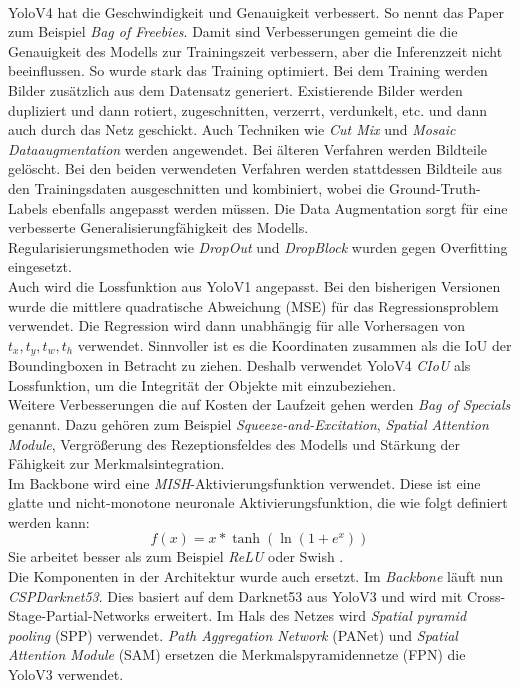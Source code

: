 \documentclass[conference]{IEEEtran}
\begin{document}
	\\
	YoloV4 hat die Geschwindigkeit und Genauigkeit verbessert. So nennt das Paper \cite{b2} zum Beispiel \textit{Bag of Freebies}. Damit sind Verbesserungen gemeint die die Genauigkeit des Modells zur Trainingszeit verbessern, aber die Inferenzzeit nicht beeinflussen. So wurde stark das Training optimiert. Bei dem Training werden Bilder zusätzlich aus dem Datensatz generiert. Existierende Bilder werden dupliziert und dann rotiert, zugeschnitten, verzerrt, verdunkelt, etc. und dann auch durch das Netz geschickt. 
	Auch Techniken wie \textit{Cut Mix} und \textit{Mosaic Dataaugmentation} werden angewendet. Bei älteren Verfahren werden Bildteile gelöscht. Bei den beiden verwendeten Verfahren werden stattdessen Bildteile aus den Trainingsdaten ausgeschnitten und kombiniert, wobei die Ground-Truth-Labels ebenfalls angepasst werden müssen. Die Data Augmentation sorgt für eine verbesserte Generalisierungfähigkeit des Modells.\\
	Regularisierungsmethoden wie \textit{DropOut} und \textit{DropBlock} wurden gegen Overfitting eingesetzt.\\
	Auch wird die Lossfunktion aus YoloV1 angepasst. Bei den bisherigen Versionen wurde die mittlere quadratische Abweichung (MSE) für das Regressionsproblem verwendet. Die Regression wird dann unabhängig für alle Vorhersagen von $t_x, t_y, t_w, t_h$ verwendet. Sinnvoller ist es die Koordinaten zusammen als die IoU der Boundingboxen in Betracht zu ziehen. Deshalb verwendet YoloV4 \textit{CIoU} als Lossfunktion, um die Integrität der Objekte mit einzubeziehen.\\
	Weitere Verbesserungen die auf Kosten der Laufzeit gehen werden \textit{Bag of Specials} genannt. Dazu gehören zum Beispiel \textit{Squeeze-and-Excitation}, \textit{Spatial Attention Module}, Vergrößerung des Rezeptionsfeldes des Modells und Stärkung der Fähigkeit zur Merkmalsintegration.\\
	Im Backbone wird eine \textit{MISH}-Aktivierungsfunktion verwendet. Diese ist eine glatte und nicht-monotone neuronale Aktivierungsfunktion, die wie folgt definiert werden kann:
	\[ f(x) = x* \tanh (\ln (1+e^x)) \]
	Sie arbeitet besser als zum Beispiel \textit{ReLU} oder Swish \cite{b7}.\\
	Die Komponenten in der Architektur wurde auch ersetzt. Im \textit{Backbone} läuft nun \textit{CSPDarknet53}. Dies basiert auf dem Darknet53 aus YoloV3 und wird mit Cross-Stage-Partial-Networks erweitert. Im Hals des Netzes wird \textit{Spatial pyramid pooling} (SPP) verwendet. \textit{Path Aggregation Network} (PANet) und \textit{Spatial Attention Module} (SAM) ersetzen die Merkmalspyramidennetze (FPN) die YoloV3 verwendet.\\
\end{document}

